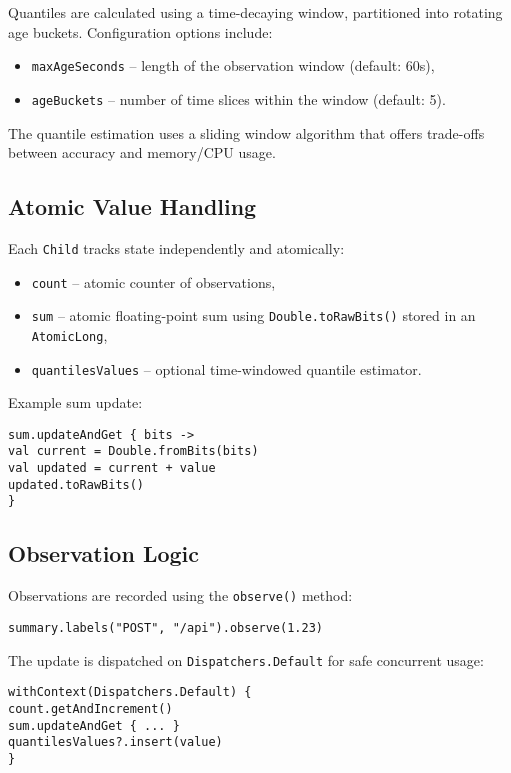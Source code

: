 Quantiles are calculated using a time-decaying window, partitioned into rotating age buckets. Configuration options include:
\begin{itemize}
\item \texttt{maxAgeSeconds} – length of the observation window (default: 60s),
\item \texttt{ageBuckets} – number of time slices within the window (default: 5).
\end{itemize}

The quantile estimation uses a sliding window algorithm that offers trade-offs between accuracy and memory/CPU usage.

\subsection{Atomic Value Handling}

Each \texttt{Child} tracks state independently and atomically:
\begin{itemize}
\item \texttt{count} – atomic counter of observations,
\item \texttt{sum} – atomic floating-point sum using \texttt{Double.toRawBits()} stored in an \texttt{AtomicLong},
\item \texttt{quantilesValues} – optional time-windowed quantile estimator.
\end{itemize}

Example sum update:
\begin{verbatim}
sum.updateAndGet { bits ->
val current = Double.fromBits(bits)
val updated = current + value
updated.toRawBits()
}
\end{verbatim}

\subsection{Observation Logic}

Observations are recorded using the \texttt{observe()} method:

\begin{verbatim}
summary.labels("POST", "/api").observe(1.23)
\end{verbatim}

The update is dispatched on \texttt{Dispatchers.Default} for safe concurrent usage:

\begin{verbatim}
withContext(Dispatchers.Default) {
count.getAndIncrement()
sum.updateAndGet { ... }
quantilesValues?.insert(value)
}
\end{verbatim}

